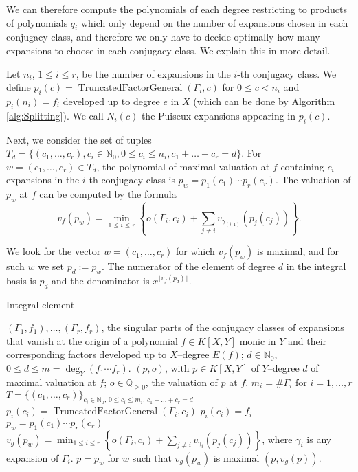 \documentclass[a4paper,11pt]{amsart}%
\theoremstyle{definition}
\theoremstyle{plain}
\theoremstyle{remark}
\DeclareMathOperator{\TruncatedFactorGeneral}{TruncatedFactorGeneral}
\newcommand{\Q}{{\mathbb Q}}
\newcommand{\N}{{\mathbb N}}
\begin{document}
We can therefore compute the polynomials of each degree restricting to
products of polynomials $q_{i}$ which only depend on the number of expansions
chosen in each conjugacy class, and therefore we only have to decide optimally
how many expansions to choose in each conjugacy class. We explain this in more detail.

Let $n_{i}$, $1 \leq i \leq r$, be the number of expansions in the $i$-th
conjugacy class. We define $p_{i}(c) = \TruncatedFactorGeneral(\varGamma_{i},
c)$ for $0 \leq c < n_{i}$ and $p_{i}(n_{i}) = f_{i}$ developed up to degree
$e$ in $X$ (which can be done by Algorithm \ref{alg:Splitting}). We call
$N_{i}(c)$ the Puiseux expansions appearing in $p_{i}(c)$.

Next, we consider the set of tuples $T_{d}=\{(c_{1},\dots,c_{r}),c_{i}%
\in{\mathbb{N}}_{0},0\leq c_{i}\leq n_{i},c_{1}+\dots+c_{r}=d\}$. For
$w=(c_{1},\dots,c_{r})\in T_{d}$, the polynomial of maximal valuation at $f$
containing $c_{i}$ expansions in the $i$-th conjugacy class is $p_{w}%
=p_{1}(c_{1})\cdots p_{r}(c_{r})$. The valuation of $p_{w}$ at $f$ can be
computed by the formula
\[
v_{f}(p_{w})=\min_{1 \leq i \leq r}\left\{  o(\varGamma_{i},c_{i})+\sum_{j\neq
i}v_{\gamma_{(i,1)}}(p_{j}(c_{j}))\right\}  .
\]


We look for the vector $w = (c_{1}, \dots, c_{r})$ for which $v_{f}(p_{w})$ is
maximal, and for such $w$ we set $p_{d} := p_{w}$. The numerator of the
element of degree $d$ in the integral basis is $p_{d}$ and the denominator is
$x^{\lfloor v_{f}(p_{d}) \rfloor}$.

\begin{algorithm}                      %
\caption{Integral element}          %
\label{alg:integralElementBasic}
\begin{algorithmic}[1]
\REQUIRE $(\varGamma_1, f_1), \dots, (\varGamma_r, f_r)$,
the singular parts of the conjugacy classes of expansions that vanish at the origin of a polynomial $f \in K[X,Y]$ monic in $Y$ and their corresponding factors developed up to $X$--degree $E(f)$;
$d \in \N_0$, $0 \leq d \leq m = \deg_Y(f_1 \cdots f_r)$.
\ENSURE $(p, o)$, with $p \in K[X,Y]$ of $Y$--degree $d$ of
maximal valuation at $f$; $o \in \Q_{\geq 0}$, the valuation of $p$ at $f$.
\STATE $m_i = \#\varGamma_i$ for $i = 1, \dots, r$
\STATE $T = \{(c_1, \dots, c_r)\}_{c_i \in \N_0 \mbox{, } 0 \leq c_i \leq m_i \mbox{, } c_1 + \dots + c_r = d}$
\STATE $p_i(c_i) = \TruncatedFactorGeneral(\varGamma_{i}, c_i)$
\ELSE
\STATE $p_{i}(c_{i}) = f_i$
\ENDIF
\ENDFOR
\STATE $p_{w} = p_{1}(c_{1})\cdots p_{r}(c_{r})$
\STATE $v_{g}(p_{w})=\min_{1 \leq i \leq r}\left\{  o(\varGamma_{i},c_{i})+\sum_{j\neq
i}v_{\gamma_{i}}(p_{j}(c_{j}))\right\}$, where $\gamma_{i}$ is any expansion of $\varGamma_i$.
\ENDFOR
\STATE $p = p_w$ for $w$ such that $v_{g}(p_{w})$ is maximal
\RETURN $(p, v_{g}(p))$.
\end{algorithmic}
\end{algorithm}
\end{document}
